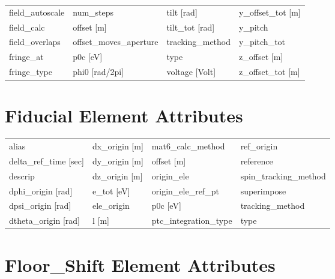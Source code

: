 \begin{tabular}{llll}
field_autoscale                & num_steps                      & tilt [rad]                     & y_offset_tot [m]               \\
field_calc                     & offset [m]                     & tilt_tot [rad]                 & y_pitch                        \\
field_overlaps                 & offset_moves_aperture          & tracking_method                & y_pitch_tot                    \\
fringe_at                      & p0c [eV]                       & type                           & z_offset [m]                   \\
fringe_type                    & phi0 [rad/2pi]                 & voltage [Volt]                 & z_offset_tot [m]               \\
 \bottomrule
 \end{tabular}
 \vfill
 
 \section{Fiducial Element Attributes}
 \label{s:list.fiducial}
 
 \begin{tabular}{llll} \toprule
alias                          & dx_origin [m]                  & mat6_calc_method               & ref_origin                     \\
delta_ref_time [sec]           & dy_origin [m]                  & offset [m]                     & reference                      \\
descrip                        & dz_origin [m]                  & origin_ele                     & spin_tracking_method           \\
dphi_origin [rad]              & e_tot [eV]                     & origin_ele_ref_pt              & superimpose                    \\
dpsi_origin [rad]              & ele_origin                     & p0c [eV]                       & tracking_method                \\
dtheta_origin [rad]            & l [m]                          & ptc_integration_type           & type                           \\
 \bottomrule
 \end{tabular}
 \vfill
 
 \section{Floor_Shift Element Attributes}
 \label{s:list.floor.shift}
 
